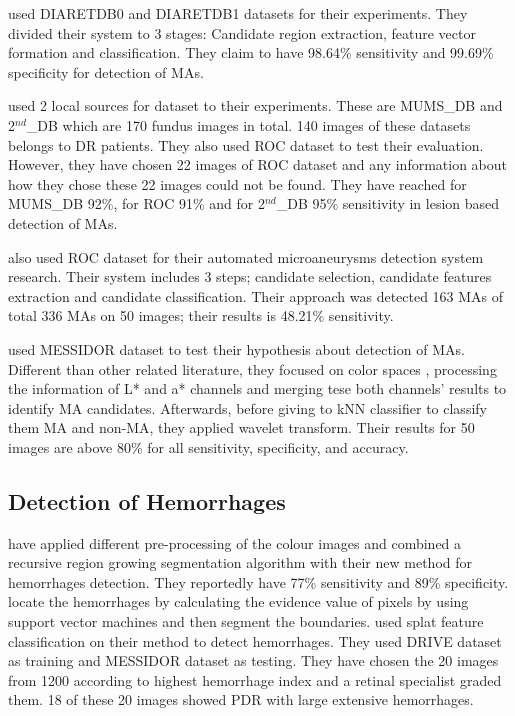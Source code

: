 \citet{akram2013identification} used DIARETDB0 and DIARETDB1 datasets for their experiments. They divided their system to 3 stages: Candidate region extraction, feature vector formation and classification. They claim to have 98.64\% sensitivity and 99.69\% specificity for detection of MAs.

\citet{tavakoli2013complementary} used 2 local sources for dataset to their experiments. These are MUMS\_DB and 2$^{nd}$\_DB which are 170 fundus images in total. 140 images of these datasets belongs to DR patients. They also used ROC dataset to test their evaluation. However, they have chosen 22 images of ROC dataset and any information about how they chose these 22 images could not be found. They have reached for MUMS\_DB 92\%, for ROC 91\% and for 2$^{nd}$\_DB 95\% sensitivity in lesion based detection of MAs.

\citet{shah2016automated} also used ROC dataset for their automated microaneurysms detection system research. Their system includes 3 steps; candidate selection, candidate features extraction and candidate classification. Their approach was detected 163 MAs of total 336 MAs on 50 images; their results is 48.21\% sensitivity.

\citet{navarro2016automatic} used MESSIDOR dataset to test their hypothesis about detection of MAs. Different than other related literature, they focused on color spaces , processing the information of L* and a* channels and merging tese both channels' results to identify MA candidates. Afterwards, before giving to kNN classifier to classify them MA and non-MA, they applied wavelet transform. Their results for 50 images are above 80\% for all sensitivity, specificity, and accuracy.





\subsection{Detection of Hemorrhages}
\citet{sinthanayothin2002automated} have applied different pre-processing of the colour images and combined a recursive region growing segmentation algorithm with their new method for hemorrhages detection. They reportedly have 77\% sensitivity and 89\% specificity.\\
\citet{zhang2005top}  locate the hemorrhages by calculating the evidence value of pixels by using support vector machines and then segment the boundaries. \citet{tang2011splat} used splat feature classification on their method to detect hemorrhages. They used DRIVE dataset as training and MESSIDOR dataset as testing. They have chosen the 20 images from 1200 according to highest hemorrhage index and a retinal specialist graded them. 18 of these 20 images showed PDR with large extensive hemorrhages. 




